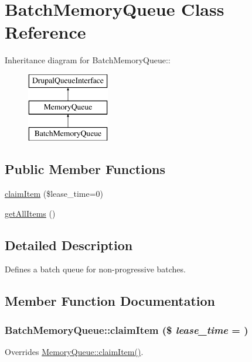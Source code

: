 \hypertarget{classBatchMemoryQueue}{
\section{BatchMemoryQueue Class Reference}
\label{classBatchMemoryQueue}
}
Inheritance diagram for BatchMemoryQueue::\begin{figure}[H]
\begin{center}
\leavevmode
\includegraphics[height=3cm]{classBatchMemoryQueue}
\end{center}
\end{figure}
\subsection*{Public Member Functions}
\begin{DoxyCompactItemize}
\item 
\hyperlink{classBatchMemoryQueue_aca687797fff1fee4a86293e8c32190ad}{claimItem} (\$lease\_\-time=0)
\item 
\hyperlink{classBatchMemoryQueue_abad9192ab29e694e10d4a520cb43e6fa}{getAllItems} ()
\end{DoxyCompactItemize}


\subsection{Detailed Description}
Defines a batch queue for non-\/progressive batches. 

\subsection{Member Function Documentation}
\hypertarget{classBatchMemoryQueue_aca687797fff1fee4a86293e8c32190ad}{
\subsubsection[{claimItem}]{\setlength{\rightskip}{0pt plus 5cm}BatchMemoryQueue::claimItem (\$ {\em lease\_\-time} = {})}}
\label{classBatchMemoryQueue_aca687797fff1fee4a86293e8c32190ad}
Overrides \hyperlink{classMemoryQueue_a24cba156a854a7b4b6c81c3d2614508d}{MemoryQueue::claimItem()}.

